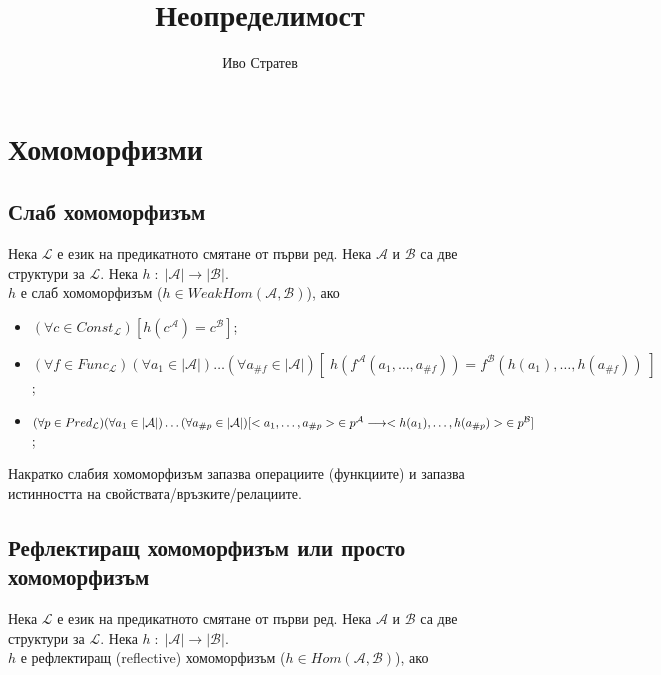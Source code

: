 \documentclass{article}[12pt]
\title{Неопределимост}
\author{Иво Стратев}
\newcommand{\Lang}{\mathcal{L}}
\begin{document}
\maketitle

\tableofcontents

\pagebreak

\section{Хомоморфизми}

\subsection{Слаб хомоморфизъм}

Нека \(\Lang\) е език на предикатното смятане от първи ред.
Нека \(\mathcal{A}\) и \(\mathcal{B}\) са две структури за \(\Lang\).
Нека \(h \; : \; |\mathcal{A}| \to |\mathcal{B}|\). \\
\(h\) е слаб хомоморфизъм (\(h \in WeakHom(\mathcal{A}, \mathcal{B})\)),
ако

\begin{itemize}
\item \((\forall c \in Const_\Lang)[h(c^\mathcal{A}) = c^\mathcal{B}]\);
\item \((\forall f \in Func_\Lang)(\forall a_1 \in |\mathcal{A}|)\dots(\forall a_{\#f} \in |\mathcal{A}|)
[\; h(f^\mathcal{A}(a_1, \dots, a_{\#f})) = f^\mathcal{B}(h(a_1), \dots, h(a_{\#f}))\;]\);
\item \((\forall p \in Pred_\Lang)(\forall a_1 \in |\mathcal{A}|)\dots(\forall a_{\#p} \in |\mathcal{A}|) \newline
[<a_1, \dots, a_{\#p}> \; \in p^\mathcal{A} \longrightarrow <h(a_1), \dots, h(a_{\#p})> \; \in p^\mathcal{B}]\);
\end{itemize}

Накратко слабия хомоморфизъм запазва операциите (функциите) и запазва истинността на свойствата/връзките/релациите.

\subsection{Рефлектиращ хомоморфизъм или просто хомоморфизъм}

Нека \(\Lang\) е език на предикатното смятане от първи ред.
Нека \(\mathcal{A}\) и \(\mathcal{B}\) са две структури за \(\Lang\).
Нека \(h \; : \; |\mathcal{A}| \to |\mathcal{B}|\). \\
\(h\) е рефлектиращ (reflective) хомоморфизъм (\(h \in Hom(\mathcal{A}, \mathcal{B})\)),
ако
\end{document}
